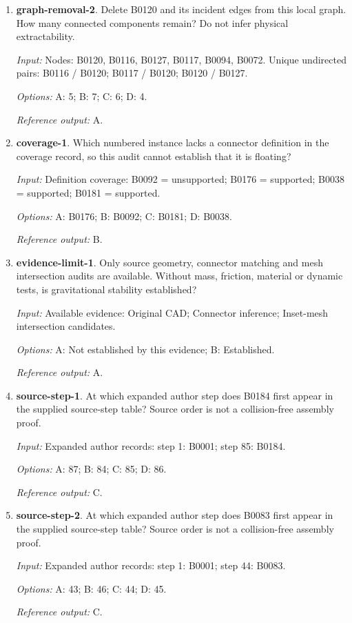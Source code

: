 \begin{enumerate}
\item \textbf{graph-removal-2}. Delete B0120 and its incident edges from this local graph. How many connected components remain? Do not infer physical extractability.\par {\small \textit{Input:} Nodes: B0120, B0116, B0127, B0117, B0094, B0072. Unique undirected pairs: B0116 / B0120; B0117 / B0120; B0120 / B0127. \par\textit{Options:} A: 5; B: 7; C: 6; D: 4. \par\textit{Reference output:} A.}
\item \textbf{coverage-1}. Which numbered instance lacks a connector definition in the coverage record, so this audit cannot establish that it is floating?\par {\small \textit{Input:} Definition coverage: B0092 = unsupported; B0176 = supported; B0038 = supported; B0181 = supported. \par\textit{Options:} A: B0176; B: B0092; C: B0181; D: B0038. \par\textit{Reference output:} B.}
\item \textbf{evidence-limit-1}. Only source geometry, connector matching and mesh intersection audits are available. Without mass, friction, material or dynamic tests, is gravitational stability established?\par {\small \textit{Input:} Available evidence: Original CAD; Connector inference; Inset-mesh intersection candidates. \par\textit{Options:} A: Not established by this evidence; B: Established. \par\textit{Reference output:} A.}
\item \textbf{source-step-1}. At which expanded author step does B0184 first appear in the supplied source-step table? Source order is not a collision-free assembly proof.\par {\small \textit{Input:} Expanded author records: step 1: B0001; step 85: B0184. \par\textit{Options:} A: 87; B: 84; C: 85; D: 86. \par\textit{Reference output:} C.}
\item \textbf{source-step-2}. At which expanded author step does B0083 first appear in the supplied source-step table? Source order is not a collision-free assembly proof.\par {\small \textit{Input:} Expanded author records: step 1: B0001; step 44: B0083. \par\textit{Options:} A: 43; B: 46; C: 44; D: 45. \par\textit{Reference output:} C.}

\end{enumerate}
